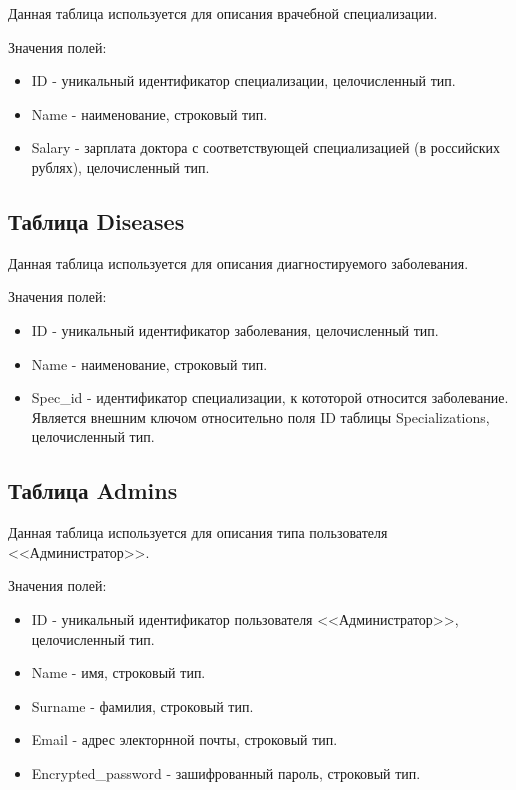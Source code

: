 Данная таблица используется для описания врачебной специализации.

Значения полей:

\begin{itemize}
	\item ID - уникальный идентификатор специализации, целочисленный тип.
	\item Name - наименование, строковый тип.
	\item Salary - зарплата доктора с соответствующей специализацией (в российских рублях), целочисленный тип.
\end{itemize}

\subsection*{Таблица Diseases}

Данная таблица используется для описания диагностируемого заболевания.

Значения полей:

\begin{itemize}
	\item ID - уникальный идентификатор заболевания, целочисленный тип.
	\item Name - наименование, строковый тип.
	\item Spec\_id - идентификатор специализации, к кототорой относится заболевание. Является внешним ключом относительно поля ID таблицы Specializations, целочисленный тип.
\end{itemize}

\subsection*{Таблица Admins}

Данная таблица используется для описания типа пользователя <<Администратор>>.

Значения полей:

\begin{itemize}
	\item ID - уникальный идентификатор пользователя <<Администратор>>, целочисленный тип.
	\item Name - имя, строковый тип.
	\item Surname - фамилия, строковый тип.
	\item Email - адрес электорнной почты, строковый тип.
	\item Encrypted\_password - зашифрованный пароль, строковый тип.
\end{itemize}


